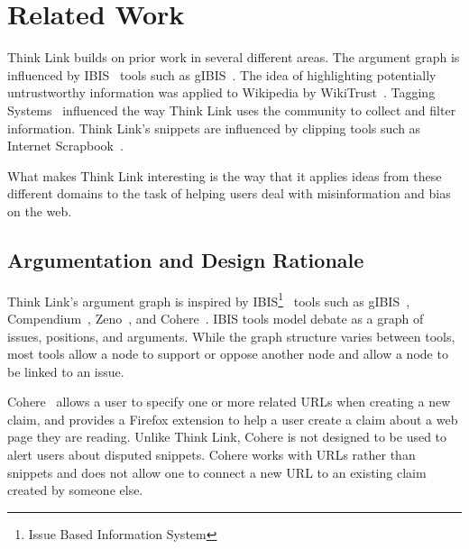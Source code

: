 \documentclass{chi2009}
\newcommand{\todo}[1]{}
\begin{document}
\todo{Talk about automatically including all arguments from Snopes}
\todo{I think we need to do some kind of evaluation of the new interface, even if it is just showing it to some people, or having people in the lab try it.}
\todo{Need figures saying how efficient it is for an activist user to mark up a topic}



\section{Related Work}
\todo{Don't cite things that aren't relevant}

Think Link builds on prior work in several different areas. The argument graph is influenced by IBIS~\cite{Rittel1973} tools such as gIBIS~\cite{Conklin1987a}. 
The idea of highlighting potentially untrustworthy information was applied to Wikipedia by WikiTrust~\cite{Adler2008a}. Tagging Systems~\cite{Marlow2006} influenced the way Think Link uses the community to collect and filter information. Think Link's snippets are influenced by clipping tools such as Internet Scrapbook~\cite{Sugiura1998}.

What makes Think Link interesting is the way that it applies ideas from these different domains to the task of helping users deal with misinformation and bias on the web.

\subsection{Argumentation and Design Rationale}

Think Link's argument graph is inspired by IBIS\footnote{Issue Based Information System}~\cite{Rittel1973} tools such as gIBIS~\cite{Conklin1987a}, Compendium~\cite{Selvin2001}, Zeno~\cite{Gordon1997}, and Cohere~\cite{Shum2008}. IBIS tools model debate as a graph of issues, positions, and arguments. While the graph structure varies between tools, most tools allow a node to support or oppose another node and allow a node to be linked to an issue. 

Cohere~\cite{Shum2008} allows a user to specify one or more related URLs when creating a new claim, and provides a Firefox extension to help a user create a claim about a web page they are reading. Unlike Think Link, Cohere is not designed to be used to alert users about disputed snippets. Cohere works with URLs rather than snippets and does not allow one to connect a new URL to an existing claim created by someone else. 
\end{document}
